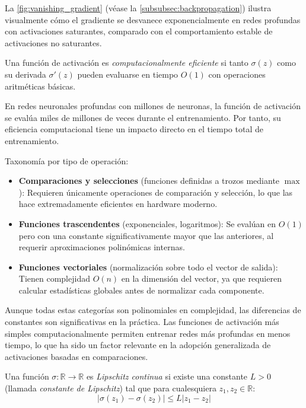 La \autoref{fig:vanishing_gradient} (véase la \autoref{subsubsec:backpropagation}) ilustra visualmente cómo el gradiente se desvanece exponencialmente en redes profundas con activaciones saturantes, comparado con el comportamiento estable de activaciones no saturantes.

\begin{definition}\label{prop:eficiencia_computacional}
	Una función de activación es \textit{computacionalmente eficiente} si tanto $\sigma(z)$ como su derivada $\sigma'(z)$ pueden evaluarse en tiempo $O(1)$ con operaciones aritméticas básicas.
\end{definition}

En redes neuronales profundas con millones de neuronas, la función de activación se evalúa miles de millones de veces durante el entrenamiento. Por tanto, su eficiencia computacional tiene un impacto directo en el tiempo total de entrenamiento.

Taxonomía por tipo de operación:
\begin{itemize}
	\item \textbf{Comparaciones y selecciones} (funciones definidas a trozos mediante $\max$): Requieren únicamente operaciones de comparación y selección, lo que las hace extremadamente eficientes en hardware moderno.
	\item \textbf{Funciones trascendentes} (exponenciales, logaritmos): Se evalúan en $O(1)$ pero con una constante significativamente mayor que las anteriores, al requerir aproximaciones polinómicas internas.
	\item \textbf{Funciones vectoriales} (normalización sobre todo el vector de salida): Tienen complejidad $O(n)$ en la dimensión del vector, ya que requieren calcular estadísticas globales antes de normalizar cada componente.
\end{itemize}

Aunque todas estas categorías son polinomiales en complejidad, las diferencias de constantes son significativas en la práctica. Las funciones de activación más simples computacionalmente permiten entrenar redes más profundas en menos tiempo, lo que ha sido un factor relevante en la adopción generalizada de activaciones basadas en comparaciones.

\begin{definition}\label{prop:lipschitz_continuidad}
	Una función $\sigma: \mathbb{R} \to \mathbb{R}$ es \textit{Lipschitz continua} si existe una constante $L > 0$ (llamada \textit{constante de Lipschitz}) tal que para cualesquiera $z_1, z_2 \in \mathbb{R}$:
	\[
	|\sigma(z_1) - \sigma(z_2)| \leq L |z_1 - z_2|
	\]
\end{definition}

